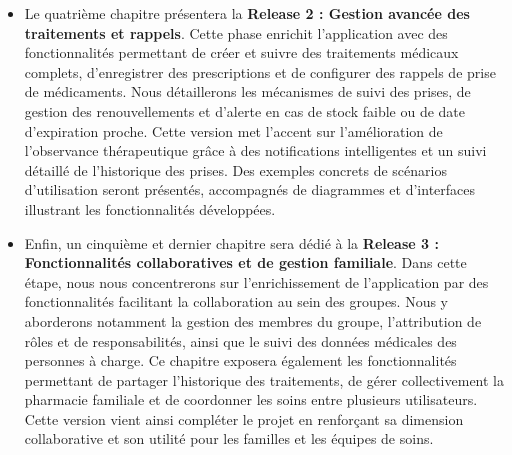 \begin{itemize}
  \item Le quatrième chapitre présentera la \textbf{Release 2 : Gestion avancée des traitements et rappels}.
  Cette phase enrichit l'application avec des fonctionnalités permettant de créer et suivre des traitements médicaux complets, d'enregistrer des prescriptions et de configurer des rappels de prise de médicaments.
  Nous détaillerons les mécanismes de suivi des prises, de gestion des renouvellements et d'alerte en cas de stock faible ou de date d'expiration proche.
  Cette version met l'accent sur l'amélioration de l'observance thérapeutique grâce à des notifications intelligentes et un suivi détaillé de l'historique des prises.
  Des exemples concrets de scénarios d'utilisation seront présentés, accompagnés de diagrammes et d'interfaces illustrant les fonctionnalités développées.

  \item Enfin, un cinquième et dernier chapitre sera dédié à la \textbf{Release 3 : Fonctionnalités collaboratives et de gestion familiale}.
  Dans cette étape, nous nous concentrerons sur l'enrichissement de l'application par des fonctionnalités facilitant la collaboration au sein des groupes.
  Nous y aborderons notamment la gestion des membres du groupe, l'attribution de rôles et de responsabilités, ainsi que le suivi des données médicales des personnes à charge.
  Ce chapitre exposera également les fonctionnalités permettant de partager l'historique des traitements, de gérer collectivement la pharmacie familiale et de coordonner les soins entre plusieurs utilisateurs.
  Cette version vient ainsi compléter le projet en renforçant sa dimension collaborative et son utilité pour les familles et les équipes de soins.
\end{itemize}



